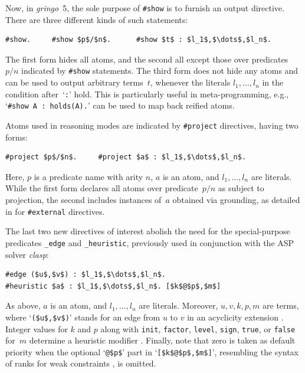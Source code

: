 \documentclass[a4paper,USenglish]{oasics-v2016}
\newcommand{\sysfont}{\textit}
\newcommand{\clasp}{\sysfont{clasp}}
\newcommand{\gringo}{\sysfont{gringo}}
\begin{document}
Now, in \gringo~5, the sole purpose of \lstinline{#show} is to furnish an output directive.
There are three different kinds of such statements:
%
\begin{lstlisting}[numbers=none,mathescape=t]
#show.     #show $p$/$n$.      #show $t$ : $l_1$,$\dots$,$l_n$.
\end{lstlisting}
%
The first form hides all atoms, and the second all except those over predicates~$p/n$ indicated by \lstinline{#show} statements.
The third form does not hide any atoms and can be used to output arbitrary terms~$t$,
whenever the literals $l_1,\dots,l_n$ in the condition after~`\lstinline{:}' hold.
This is particularly useful in meta-programming,
e.g., `\lstinline{#show A : holds(A).}' can be used to map back reified atoms.

Atoms used in reasoning modes are indicated by \lstinline{#project} directives, having two forms:
%
\begin{lstlisting}[numbers=none,mathescape=t]
#project $p$/$n$.     #project $a$ : $l_1$,$\dots$,$l_n$.
\end{lstlisting}
%
Here, $p$ is a predicate name with arity $n$, $a$ is an atom, and $l_1,\dots,l_n$ are %
literals.
While the first form declares all atoms over predicate~$p/n$ as %
subject to projection,
the second includes instances of~$a$
obtained via grounding, as detailed in \cite{gekakasc14b} for
\lstinline{#external} directives.

The last two new directives of interest abolish the need for %
the special-purpose predicates \lstinline{_edge} and \lstinline{_heuristic},
previously used in conjunction with the ASP solver \clasp:
\begin{lstlisting}[numbers=none,mathescape=t]
#edge ($u$,$v$) : $l_1$,$\dots$,$l_n$.
#heuristic $a$ : $l_1$,$\dots$,$l_n$. [$k$@$p$,$m$]
\end{lstlisting}
As above, $a$ is an atom, and $l_1,\dots,l_n$ are literals.
Moreover,
$u,v,k,p,m$ are terms, %
where 
`\lstinline[mathescape=t]{($u$,$v$)}' stands for an
edge from $u$ to $v$ in an acyclicity extension \cite{bogejakasc15a}.
Integer values for $k$ and $p$ along with
\lstinline{init}, \lstinline{factor}, \lstinline{level}, \lstinline{sign}, \lstinline{true}, or \lstinline{false} for~$m$
determine a heuristic modifier \cite{gekaotroscwa13a}.
Finally, note that
zero is taken as default priority when
the optional `\lstinline[mathescape=t]{@$p$}' part 
in `\lstinline[mathescape=t]{[$k$@$p$,$m$]}',
resembling the syntax of ranks for weak constraints \cite{aspcore2},
is omitted.
\end{document}
